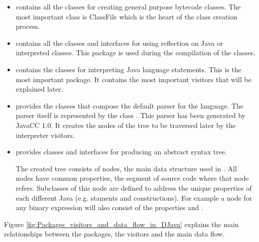 \begin{itemize}
\item {} contains all the classes for creating general purpose bytecode classes. The most important class is ClassFile which is the heart of the class creation process.

\item {} contains all the classes and interfaces for using reflection on Java or interpreted classes. This package is used during the compilation of the classes.

\item {} contains the classes for interpreting Java language statements. This is the most important package. It contains the most important visitors that will be explained later.

\item {} provides the classes that compose the default parser for the language. The parser itself is represented by the class . This parser has been generated by JavaCC 1.0. It creates the nodes of the tree to be traversed later by the interpreter visitors.

\item {} provides classes and interfaces for producing an abstract syntax tree.

The created tree consists of nodes, the main data structure used in \djava{}. All nodes have common properties, the segment of source code where that node refers. Subclasses of this node are defined to address the unique properties of each different Java (e.g. staments and constructions). For example a node for any binary expression will also consist of the properties  and .

\end{itemize}

Figure \ref{fig:Packages_visitors_and_data_flow_in_DJava} explains the main relationships between the packages, the visitors and the main data flow.

